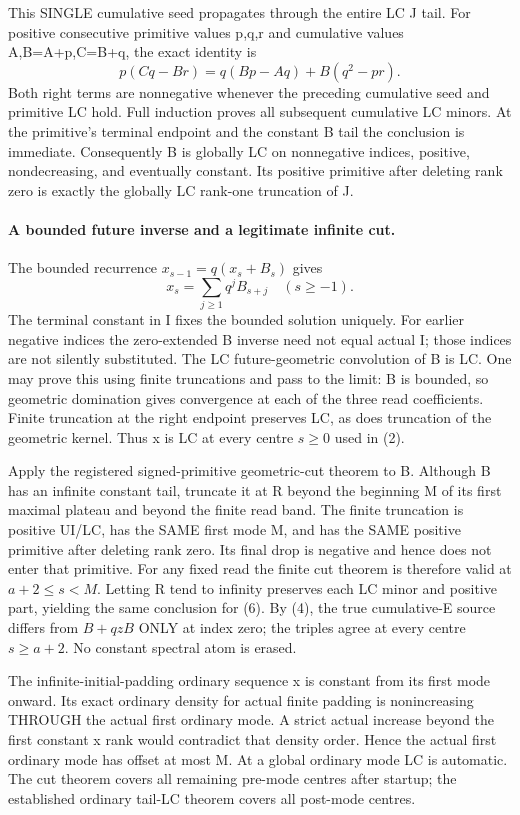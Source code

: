 This SINGLE cumulative seed propagates through the entire LC J tail.
For positive consecutive primitive values p,q,r and cumulative values
A,B=A+p,C=B+q, the exact identity is
\[
 p(Cq-Br)=q(Bp-Aq)+B(q^2-pr).
\]
Both right terms are nonnegative whenever the preceding cumulative
seed and primitive LC hold. Full induction proves all subsequent
cumulative LC minors. At the primitive's terminal endpoint and the
constant B tail the conclusion is immediate.
Consequently B is globally LC on nonnegative indices, positive,
nondecreasing, and eventually constant. Its positive primitive after
deleting rank zero is exactly the globally LC rank-one truncation of J.

\paragraph{A bounded future inverse and a legitimate infinite cut.}
The bounded recurrence $x_{s-1}=q(x_s+B_s)$ gives
\[
                    x_s=\sum_{j\ge1}q^jB_{s+j}\quad(s\ge-1).       \tag{6}
\]
The terminal constant in I fixes the bounded solution uniquely.
For earlier negative indices the zero-extended B inverse need not
equal actual I; those indices are not silently substituted.
The LC future-geometric convolution of B is LC.
One may prove this using finite truncations and pass to the limit:
B is bounded, so geometric domination gives convergence at each
of the three read coefficients. Finite truncation at the right endpoint
preserves LC, as does truncation of the geometric kernel.
Thus x is LC at every centre $s\ge0$ used in (2).

Apply the registered signed-primitive geometric-cut theorem to B.
Although B has an infinite constant tail, truncate it at R beyond the
beginning M of its first maximal plateau and beyond the finite read band.
The finite truncation is positive UI/LC, has the SAME first mode M,
and has the SAME positive primitive after deleting rank zero.
Its final drop is negative and hence does not enter that primitive.
For any fixed read the finite cut theorem is therefore valid at
$a+2\le s<M$. Letting R tend to infinity preserves each LC minor
and positive part, yielding the same conclusion for (6).
By (4), the true cumulative-E source differs from $B+qzB$ ONLY at
index zero; the triples agree at every centre $s\ge a+2$.
No constant spectral atom is erased.

The infinite-initial-padding ordinary sequence x is constant from
its first mode onward. Its exact ordinary density for actual finite
padding is nonincreasing THROUGH the actual first ordinary mode.
A strict actual increase beyond the first constant x rank would
contradict that density order. Hence the actual first ordinary mode
has offset at most M. At a global ordinary mode LC is automatic.
The cut theorem covers all remaining pre-mode centres after startup;
the established ordinary tail-LC theorem covers all post-mode centres.

